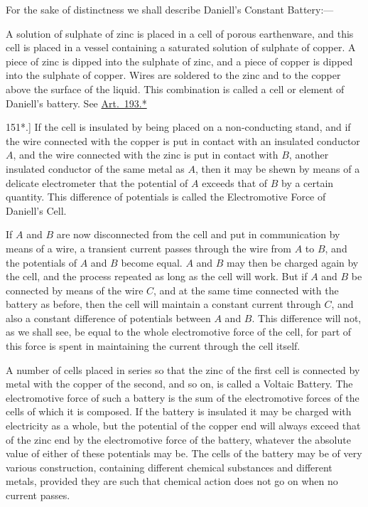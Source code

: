 \documentclass[12pt,oneside]{book}[2021/10/04]
\newcommand{\Runhead}[1]{\fancyhead[C]{\iffloatpage{}{\small#1}}}
\newcommand{\article}[1]{\phantomsection \label{art:#1}{#1.]}}
\newcommand{\¬}{\hphantom{0}}
\begin{document}
For the sake of distinctness we shall describe Daniell's Constant
Battery:---

A solution of sulphate of zinc is placed in a cell of porous earthenware,
and this cell is placed in a vessel containing a saturated
solution of sulphate of copper. A piece of zinc is dipped into the
sulphate of zinc, and a piece of copper is dipped into the sulphate
of copper. Wires are soldered to the zinc and to the copper above
the surface of the liquid. This combination is called a cell or
element of Daniell's battery. See \hyperref[art:193*]{Art.\ 193.*}
\Runhead{DANIELL'S BATTERY.}

\article{151*} If the cell is insulated by being placed on a non-conducting
stand, and if the wire connected with the copper is put
in contact with an insulated conductor \(A\), and the wire connected
with the zinc is put in contact with \(B\), another insulated conductor
of the same metal as \(A\), then it may be shewn by means of a delicate
electrometer that the potential of \(A\) exceeds that of \(B\) by a
certain quantity. This difference of potentials is called the Electromotive
Force of Daniell's Cell.

If \(A\) and \(B\) are now disconnected from the cell and put in
communication by means of a wire, a transient current passes
through the wire from \(A\) to \(B\), and the potentials of \(A\) and \(B\)
become equal. \(A\) and \(B\) may then be charged again by the cell,
and the process repeated as long as the cell will work. But if
\(A\) and \(B\) be connected by means of the wire \(C\), and at the same
time connected with the battery as before, then the cell will maintain
a constant current through \(C\), and also a constant difference
of potentials between \(A\) and \(B\). This difference will not, as we
shall see, be equal to the whole electromotive force of the cell, for
part of this force is spent in maintaining the current through the
cell itself.

A number of cells placed in series so that the zinc of the first
cell is connected by metal with the copper of the second, and so
on, is called a Voltaic Battery. The electromotive force of such a
battery is the sum of the electromotive forces of the cells of which
it is composed. If the battery is insulated it may be charged with
electricity as a whole, but the potential of the copper end will
always exceed that of the zinc end by the electromotive force of
the battery, whatever the absolute value of either of these potentials
may be. The cells of the battery may be of very various construction,
containing different chemical substances and different metals,
provided they are such that chemical action does not go on when
no current passes.
\end{document}
